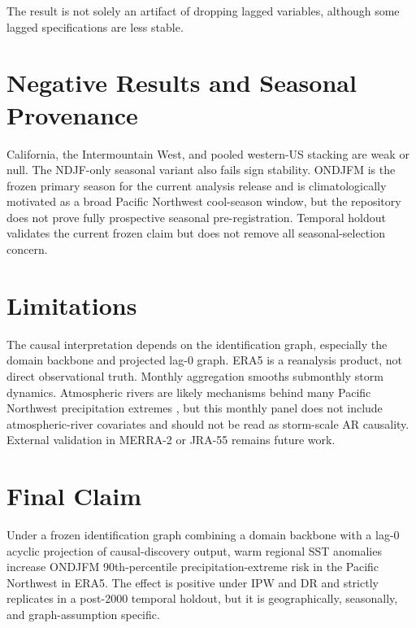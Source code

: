 \documentclass[11pt]{article}
\begin{document}
The result is not solely an artifact of dropping lagged variables, although some
lagged specifications are less stable.

\section{Negative Results and Seasonal Provenance}

California, the Intermountain West, and pooled western-US stacking are weak or
null. The NDJF-only seasonal variant also fails sign stability. ONDJFM is the
frozen primary season for the current analysis release and is climatologically
motivated as a broad Pacific Northwest cool-season window, but the repository
does not prove fully prospective seasonal pre-registration. Temporal holdout
validates the current frozen claim but does not remove all seasonal-selection
concern.

\section{Limitations}

The causal interpretation depends on the identification graph, especially the
domain backbone and projected lag-0 graph. ERA5 is a reanalysis product, not
direct observational truth. Monthly aggregation smooths submonthly storm
dynamics. Atmospheric rivers are likely mechanisms behind many Pacific Northwest
precipitation extremes \citep{dettiger2011climate}, but this monthly panel does
not include atmospheric-river covariates and should not be read as storm-scale
AR causality. External validation in MERRA-2 or JRA-55 remains future work.

\section{Final Claim}

Under a frozen identification graph combining a domain backbone with a lag-0
acyclic projection of causal-discovery output, warm regional SST anomalies
increase ONDJFM 90th-percentile precipitation-extreme risk in the Pacific
Northwest in ERA5. The effect is positive under IPW and DR and strictly
replicates in a post-2000 temporal holdout, but it is geographically,
seasonally, and graph-assumption specific.



\end{document}
